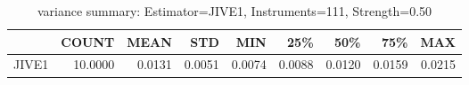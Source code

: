 \begin{table}[ht]
\centering
\caption{variance summary: Estimator=JIVE1, Instruments=111, Strength=0.50}
\begin{tabular}{lrrrrrrrr}
\toprule
 & COUNT & MEAN & STD & MIN & 25\% & 50\% & 75\% & MAX \\
\midrule
JIVE1 & 10.0000 & 0.0131 & 0.0051 & 0.0074 & 0.0088 & 0.0120 & 0.0159 & 0.0215 \\
\bottomrule
\end{tabular}
\end{table}
